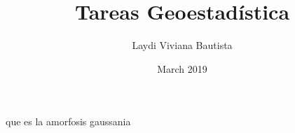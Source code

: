 \documentclass{article}
\title{Tareas Geoestadística}
\author{Laydi Viviana Bautista}
\date{March 2019}
\begin{document}
que es la amorfosis gaussania
\end{document}
